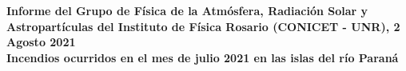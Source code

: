 \begin{center}
    \textbf{
        \textcolor{title}{Informe del Grupo de Física de la Atmósfera, Radiación Solar y Astropartículas del Instituto de Física Rosario (CONICET - UNR), 2 Agosto 2021\vspace{1cm}\\ }
        \textcolor{title}{Incendios ocurridos en el mes de julio 2021 en las islas del río Paraná}}
\end{center}